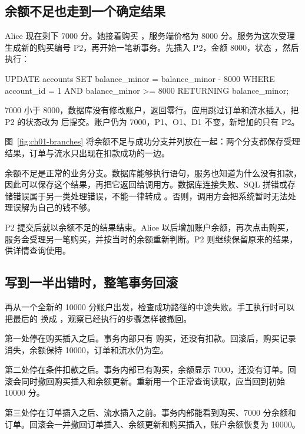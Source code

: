 \subsection*{余额不足也走到一个确定结果}

Alice 现在剩下 7000 分。她接着购买 ，服务端价格为 8000 分。服务为这次受理生成新的购买编号 P2，再开始一笔新事务。先插入 P2，金额 8000，状态 ，然后执行：

\begin{BookCode}
UPDATE accounts
SET balance_minor = balance_minor - 8000
WHERE account_id = 1
  AND balance_minor >= 8000
RETURNING balance_minor;
\end{BookCode}

7000 小于 8000，数据库没有修改账户，返回零行。应用跳过订单和流水插入，把 P2 的状态改为  后提交。账户仍为 7000，P1、O1、D1 不变，新增加的只有 P2。

图~\ref{fig:ch01-branches} 将余额不足与成功分支并列放在一起：两个分支都保存受理结果，订单与流水只出现在扣款成功的一边。

余额不足是正常的业务分支。数据库能够执行语句，服务也知道为什么没有扣款，因此可以保存这个结果，再把它返回给调用方。数据库连接失败、SQL 拼错或存储错误属于另一类处理错误，不能一律转成 。否则，调用方会把系统暂时无法处理误解为自己的钱不够。

P2 提交后就以余额不足的结果结束。Alice 以后增加账户余额，再次点击购买，服务会受理另一笔购买，并按当时的余额重新判断。P2 则继续保留原来的结果，供详情查询使用。



\subsection*{写到一半出错时，整笔事务回滚}

再从一个全新的 10000 分账户出发，检查成功路径的中途失败。手工执行时可以把最后的  换成 ，观察已经执行的步骤怎样被撤回。

第一处停在购买插入之后。事务内部只有  购买，还没有扣款。回滚后，购买记录消失，余额保持 10000，订单和流水仍为空。

第二处停在条件扣款之后。事务内部已有购买，余额显示 7000，还没有订单。回滚会同时撤回购买插入和余额更新。重新用一个正常查询读取，应当回到初始 10000 分。

第三处停在订单插入之后、流水插入之前。事务内部能看到购买、7000 分余额和订单。回滚会一并撤回订单插入、余额更新和购买插入，账户余额恢复为 10000。

